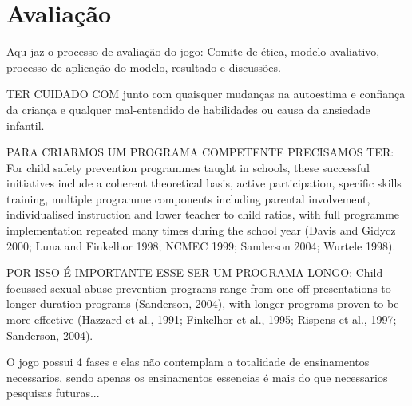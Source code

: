 \chapter{Avaliação}\label{ch:Avaliacao}

Aqu jaz o processo de avaliação do jogo:
Comite de ética, modelo avaliativo, processo de aplicação do modelo, resultado e discussões. 


TER CUIDADO COM junto com quaisquer mudanças na autoestima e confiança da criança e qualquer mal-entendido de habilidades ou causa da ansiedade infantil.


PARA CRIARMOS UM PROGRAMA COMPETENTE PRECISAMOS TER: For child safety prevention programmes taught in schools, these successful initiatives include a coherent theoretical basis, active participation, specific skills training, multiple programme components including parental involvement, individualised instruction and lower teacher to child ratios, with full programme implementation repeated many times during the school year (Davis and Gidycz 2000; Luna and Finkelhor 1998; NCMEC 1999; Sanderson 2004; Wurtele 1998).

POR ISSO É IMPORTANTE ESSE SER UM PROGRAMA LONGO: Child-focussed sexual abuse prevention programs range from one-off presentations to longer-duration programs (Sanderson, 2004), with longer programs proven to be more effective (Hazzard et al., 1991; Finkelhor et al., 1995; Rispens et al., 1997; Sanderson, 2004). %




O jogo possui 4 fases e elas não contemplam a totalidade de ensinamentos necessarios, sendo apenas os ensinamentos essencias é mais do que necessarios pesquisas futuras... 







